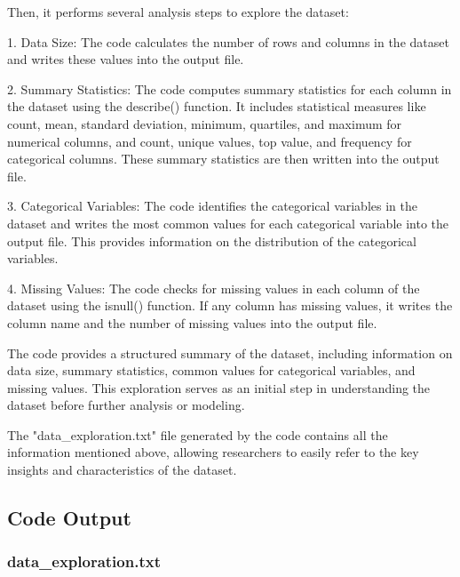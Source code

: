 \documentclass[11pt]{article}
\begin{document}
Then, it performs several analysis steps to explore the dataset:

1. Data Size: The code calculates the number of rows and columns in the dataset and writes these values into the output file.

2. Summary Statistics: The code computes summary statistics for each column in the dataset using the describe() function. It includes statistical measures like count, mean, standard deviation, minimum, quartiles, and maximum for numerical columns, and count, unique values, top value, and frequency for categorical columns. These summary statistics are then written into the output file.

3. Categorical Variables: The code identifies the categorical variables in the dataset and writes the most common values for each categorical variable into the output file. This provides information on the distribution of the categorical variables.

4. Missing Values: The code checks for missing values in each column of the dataset using the isnull() function. If any column has missing values, it writes the column name and the number of missing values into the output file.

The code provides a structured summary of the dataset, including information on data size, summary statistics, common values for categorical variables, and missing values. This exploration serves as an initial step in understanding the dataset before further analysis or modeling.

The "data\_exploration.txt" file generated by the code contains all the information mentioned above, allowing researchers to easily refer to the key insights and characteristics of the dataset.

\subsection{Code Output}

\subsubsection*{data\_exploration.txt}
\end{document}
